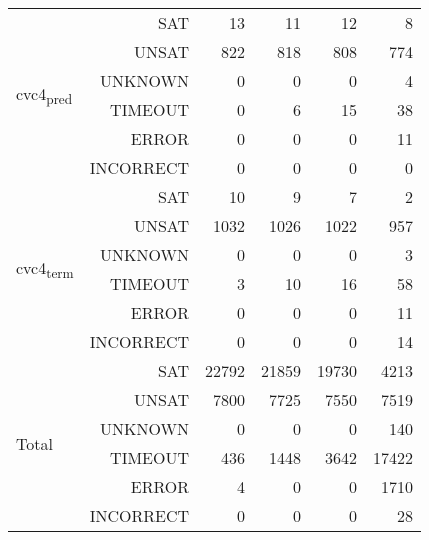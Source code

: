 \begin{table}[h]
{{\begin{tabular}{|l r | r r r r |}
\multirow{6}{*}{cvc4\textsubscript{pred}} & SAT &    13&    11&    12&     8 \\
							& UNSAT    &   822&   818&   808&   774 \\
							& UNKNOWN  &     0&     0&     0&     4 \\
							& TIMEOUT  &     0&     6&    15&    38 \\
							& ERROR    &     0&     0&     0&     11 \\
							& INCORRECT&     0&     0&     0&     0 \\ \hline
\multirow{6}{*}{cvc4\textsubscript{term}} & SAT &    10&     9&     7&    2 \\
							& UNSAT    &  1032&  1026&  1022&   957 \\
							& UNKNOWN  &     0&     0&     0&     3 \\
							& TIMEOUT  &     3&    10&    16&    58 \\
							& ERROR    &     0&     0&     0&     11 \\
							& INCORRECT&     0&     0&     0&    14 \\ \hline \hline
\multirow{6}{*}{Total} 		& SAT      & 22792& 21859& 19730&  4213\\
							& UNSAT    &  7800&  7725&  7550&  7519\\
							& UNKNOWN  &     0&     0&     0&   140\\
							& TIMEOUT  &  436&  1448&  3642& 17422 \\
							& ERROR    &     4&     0&     0&  1710\\
							& INCORRECT&     0&     0&     0&    28 \\\hline
\end{tabular}}
\label{table:base_benchmark}}
\end{table}

